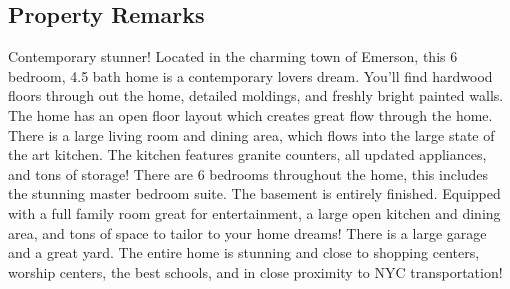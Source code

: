 \documentclass[10pt,letterpaper,twocolumn,landscape]{article}
\newenvironment{cframed}{\begin{mdframed}[linecolor=logoPeach,linewidth=0.4mm]}{\end{mdframed}}
\begin{document}
\begin{cframed}
\section*{Property Remarks}
Contemporary stunner! Located in the charming town of Emerson, this 6 bedroom, 4.5 bath home is a contemporary lovers dream. You'll find hardwood floors through out the home, detailed moldings, and freshly bright painted walls. The home has an open floor layout which creates great flow through the home. There is a large living room and dining area, which flows into the large state of the art kitchen. The kitchen features granite counters, all updated appliances, and tons of storage! There are 6 bedrooms throughout the home, this includes the stunning master bedroom suite. The basement is entirely finished. Equipped with a full family room great for entertainment, a large open kitchen and dining area, and tons of space to tailor to your home dreams! There is a large garage and a great yard. The entire home is stunning and close to shopping centers, worship centers, the best schools, and in close proximity to NYC transportation!
\end{cframed}




\newpage
\end{document}

